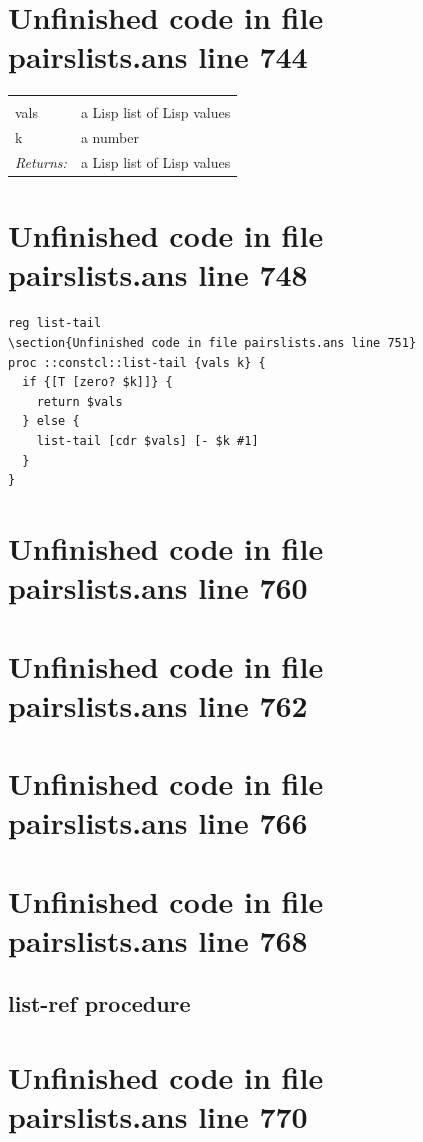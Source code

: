 \documentclass[twoside,9pt]{report}
\begin{document}
\section{Unfinished code in file pairslists.ans line 744}
\noindent\begin{tabular}{ |p{1.9cm} p{8cm}| }
\hline
\rowcolor[HTML]{CCCCCC} \multicolumn{2}{|l|}{\bf list-tail (public)} \\
vals & a Lisp list of Lisp values \\
k & a number \\
\textit{Returns:} & a Lisp list of Lisp values \\
\hline
\end{tabular}
\section{Unfinished code in file pairslists.ans line 748}
\begin{lstlisting}
reg list-tail
\section{Unfinished code in file pairslists.ans line 751}
proc ::constcl::list-tail {vals k} {
  if {[T [zero? $k]]} {
    return $vals
  } else {
    list-tail [cdr $vals] [- $k #1]
  }
}
\end{lstlisting}
\section{Unfinished code in file pairslists.ans line 760}
\section{Unfinished code in file pairslists.ans line 762}
\section{Unfinished code in file pairslists.ans line 766}
\section{Unfinished code in file pairslists.ans line 768}
\subsection{list-ref procedure}
\label{list-ref-procedure}
\section{Unfinished code in file pairslists.ans line 770}
\end{document}
